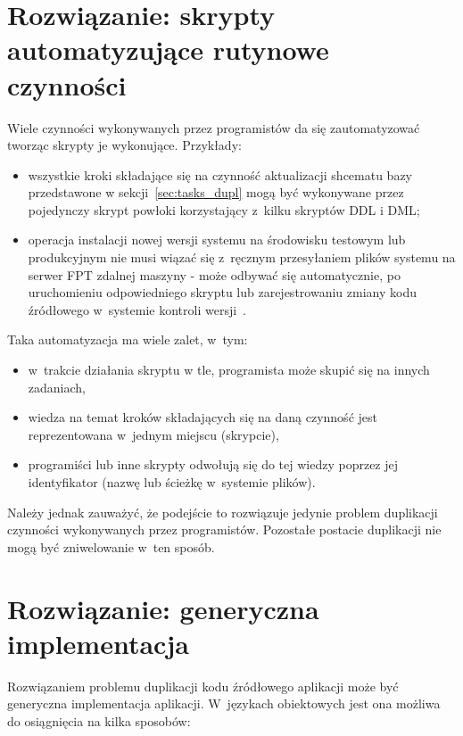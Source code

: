 \section{Rozwiązanie: skrypty automatyzujące rutynowe czynności} \label{sec:tasks_scripts}

Wiele czynności wykonywanych przez programistów da się zautomatyzować tworząc skrypty je wykonujące.
Przykłady:

\begin{itemize}
 \item wszystkie kroki składające się na czynność aktualizacji shcematu bazy przedstawone w sekcji~\ref{sec:tasks_dupl} mogą być wykonywane przez pojedynczy skrypt powłoki korzystający z~kilku skryptów DDL i DML;
 \item operacja instalacji nowej wersji systemu na środowisku testowym lub produkcyjnym nie musi wiązać się z~ręcznym przesyłaniem plików systemu na serwer FPT zdalnej maszyny - może odbywać się automatycznie, po uruchomieniu odpowiedniego skryptu lub zarejestrowaniu zmiany kodu źródłowego w~systemie kontroli wersji~\cite{cont_delivery}.
\end{itemize}

Taka automatyzacja ma wiele zalet, w~tym:

\begin{itemize}
 \item w~trakcie działania skryptu w tle, programista może skupić się na innych zadaniach,
 \item wiedza na temat kroków składających się na daną czynność jest reprezentowana w~jednym miejscu (skrypcie),
 \item programiści lub inne skrypty odwołują się do tej wiedzy poprzez jej identyfikator (nazwę lub ścieżkę w~systemie plików).
\end{itemize}

Należy jednak zauważyć, że podejście to rozwiązuje jedynie problem duplikacji czynności wykonywanych przez programistów.
Pozostałe postacie duplikacji nie mogą być zniwelowanie w~ten sposób.



\section{Rozwiązanie: generyczna implementacja}

Rozwiązaniem problemu duplikacji kodu źródłowego aplikacji może być generyczna implementacja aplikacji.
W~językach obiektowych jest ona możliwa do osiągnięcia na kilka sposobów:


